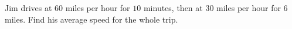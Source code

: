 Jim drives at $60$ miles per hour for $10$ minutes, then at $30$ miles per hour for $6$ miles. Find his average speed for the whole trip.
